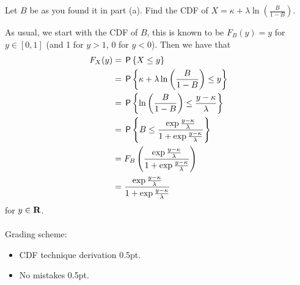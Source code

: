 \begin{exercise}[1]
Let $B$ be as you found it in part (a). Find the CDF of $X = \kappa + \lambda\ln{\left(\frac{B}{1-B}\right)}$.
\begin{solution}
As usual, we start with the CDF of $B$, this is known to be $F_B(y) = y$ for $y\in[0,1]$ (and 1 for $y>1$, 0 for $y<0$). Then we have that
\begin{align*}
    F_X(y) &= \P{X\leq y}\\
    &= \P{\kappa + \lambda\ln{\left(\frac{B}{1-B}\right)}\leq y}\\
    &= \P{\ln{\left(\frac{B}{1-B}\right)} \leq \frac{y-\kappa}{\lambda}}\\
    &= \P{B\leq \frac{\exp{\frac{y-\kappa}{\lambda}}}{1+\exp{\frac{y-\kappa}{\lambda}}}}\\
    &= F_B\left(\frac{\exp{\frac{y-\kappa}{\lambda}}}{1+\exp{\frac{y-\kappa}{\lambda}}}\right)\\
    &= \frac{\exp{\frac{y-\kappa}{\lambda}}}{1+\exp{\frac{y-\kappa}{\lambda}}}
\end{align*}
for $y\in\bf{R}$.
\\\\
Grading scheme:
\begin{itemize}
    \item CDF technique derivation 0.5pt.
    \item No mistakes 0.5pt.
\end{itemize}
\end{solution}
\end{exercise}

